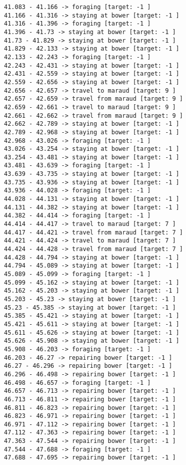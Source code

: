 \documentclass[11pt]{article}
\begin{document}
\begin{Verbatim}[commandchars=\\\{\}]
41.083 - 41.166 -> foraging [target: -1 ]
41.166 - 41.316 -> staying at bower [target: -1 ]
41.316 - 41.396 -> foraging [target: -1 ]
41.396 - 41.73 -> staying at bower [target: -1 ]
41.73 - 41.829 -> staying at bower [target: -1 ]
41.829 - 42.133 -> staying at bower [target: -1 ]
42.133 - 42.243 -> foraging [target: -1 ]
42.243 - 42.431 -> staying at bower [target: -1 ]
42.431 - 42.559 -> staying at bower [target: -1 ]
42.559 - 42.656 -> staying at bower [target: -1 ]
42.656 - 42.657 -> travel to maraud [target: 9 ]
42.657 - 42.659 -> travel from maraud [target: 9 ]
42.659 - 42.661 -> travel to maraud [target: 9 ]
42.661 - 42.662 -> travel from maraud [target: 9 ]
42.662 - 42.789 -> staying at bower [target: -1 ]
42.789 - 42.968 -> staying at bower [target: -1 ]
42.968 - 43.026 -> foraging [target: -1 ]
43.026 - 43.254 -> staying at bower [target: -1 ]
43.254 - 43.481 -> staying at bower [target: -1 ]
43.481 - 43.639 -> foraging [target: -1 ]
43.639 - 43.735 -> staying at bower [target: -1 ]
43.735 - 43.936 -> staying at bower [target: -1 ]
43.936 - 44.028 -> foraging [target: -1 ]
44.028 - 44.131 -> staying at bower [target: -1 ]
44.131 - 44.382 -> staying at bower [target: -1 ]
44.382 - 44.414 -> foraging [target: -1 ]
44.414 - 44.417 -> travel to maraud [target: 7 ]
44.417 - 44.421 -> travel from maraud [target: 7 ]
44.421 - 44.424 -> travel to maraud [target: 7 ]
44.424 - 44.428 -> travel from maraud [target: 7 ]
44.428 - 44.794 -> staying at bower [target: -1 ]
44.794 - 45.089 -> staying at bower [target: -1 ]
45.089 - 45.099 -> foraging [target: -1 ]
45.099 - 45.162 -> staying at bower [target: -1 ]
45.162 - 45.203 -> staying at bower [target: -1 ]
45.203 - 45.23 -> staying at bower [target: -1 ]
45.23 - 45.385 -> staying at bower [target: -1 ]
45.385 - 45.421 -> staying at bower [target: -1 ]
45.421 - 45.611 -> staying at bower [target: -1 ]
45.611 - 45.626 -> staying at bower [target: -1 ]
45.626 - 45.908 -> staying at bower [target: -1 ]
45.908 - 46.203 -> foraging [target: -1 ]
46.203 - 46.27 -> repairing bower [target: -1 ]
46.27 - 46.296 -> repairing bower [target: -1 ]
46.296 - 46.498 -> repairing bower [target: -1 ]
46.498 - 46.657 -> foraging [target: -1 ]
46.657 - 46.713 -> repairing bower [target: -1 ]
46.713 - 46.811 -> repairing bower [target: -1 ]
46.811 - 46.823 -> repairing bower [target: -1 ]
46.823 - 46.971 -> repairing bower [target: -1 ]
46.971 - 47.112 -> repairing bower [target: -1 ]
47.112 - 47.363 -> repairing bower [target: -1 ]
47.363 - 47.544 -> repairing bower [target: -1 ]
47.544 - 47.688 -> foraging [target: -1 ]
47.688 - 47.695 -> repairing bower [target: -1 ]

\end{Verbatim}
\end{document}
